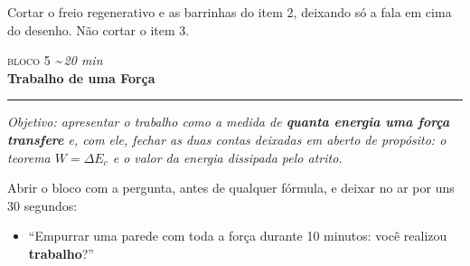 \documentclass[11pt,a4paper]{article}
\newcommand{\bloco}[3]{%
  \needspace{7\baselineskip}
  \vspace{1.8em}
  {\scshape\color{vinho}bloco #1}\hfill
    {\small\itshape\color{grafite}\textasciitilde\,#3 min}\\[0.1em]
  {\Large\bfseries #2}\\[-0.55em]
  {\color{black!30}\rule{\linewidth}{0.5pt}}
  \par\nobreak\smallskip
}
\newcommand{\objetivo}[1]{{\itshape\color{grafite}Objetivo: #1}\par\smallskip}
\begin{document}
\begin{corte}
Cortar o freio regenerativo e as barrinhas do item 2, deixando s\'o a
fala em cima do desenho. N\~ao cortar o item 3.
\end{corte}

\bloco{5}{Trabalho de uma For\c{c}a}{20}

\objetivo{apresentar o trabalho como a medida de \textbf{quanta energia
uma for\c{c}a transfere} e, com ele, fechar as duas contas deixadas em
aberto de prop\'osito: o teorema $W = \Delta E_c$ e o valor da energia
dissipada pelo atrito.}

\begin{perguntas}
Abrir o bloco com a pergunta, antes de qualquer f\'ormula, e deixar no
ar por uns 30 segundos:
\begin{itemize}[nosep]
  \item ``Empurrar uma parede com toda a for\c{c}a durante 10 minutos:
        voc\^e realizou \textbf{trabalho}?''
\end{itemize}
\end{perguntas}
\end{document}
